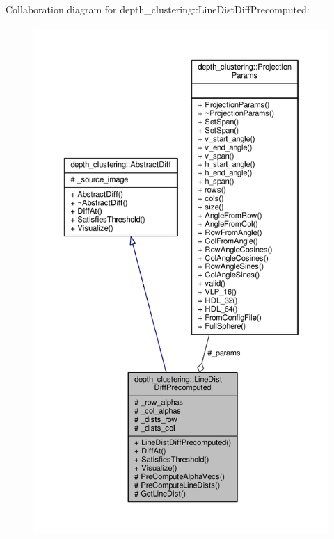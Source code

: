 Collaboration diagram for depth\-\_\-clustering\-:\-:Line\-Dist\-Diff\-Precomputed\-:
\nopagebreak
\begin{figure}[H]
\begin{center}
\leavevmode
\includegraphics[height=550pt]{classdepth__clustering_1_1LineDistDiffPrecomputed__coll__graph}
\end{center}
\end{figure}


